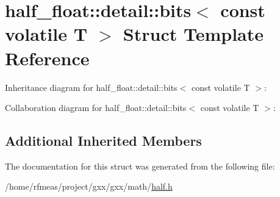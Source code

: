 \hypertarget{structhalf__float_1_1detail_1_1bits_3_01const_01volatile_01T_01_4}{}\section{half\+\_\+float\+:\+:detail\+:\+:bits$<$ const volatile T $>$ Struct Template Reference}
\label{structhalf__float_1_1detail_1_1bits_3_01const_01volatile_01T_01_4}


Inheritance diagram for half\+\_\+float\+:\+:detail\+:\+:bits$<$ const volatile T $>$\+:


Collaboration diagram for half\+\_\+float\+:\+:detail\+:\+:bits$<$ const volatile T $>$\+:
\subsection*{Additional Inherited Members}


The documentation for this struct was generated from the following file\+:\begin{DoxyCompactItemize}
\item 
/home/rfmeas/project/gxx/gxx/math/\hyperlink{half_8h}{half.\+h}\end{DoxyCompactItemize}
